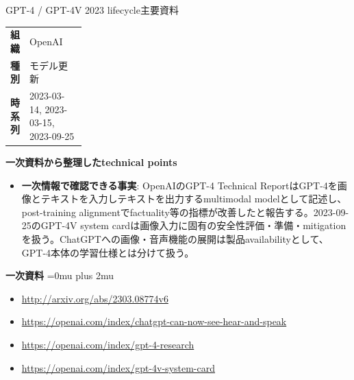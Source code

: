 \begin{technicalnote}{GPT-4 / GPT-4V 2023 lifecycle}{主要資料}
\begingroup
\begin{tabularx}{\linewidth}{@{}>{\bfseries}p{0.22\linewidth}X@{}}
組織 & OpenAI \\
種別 & モデル更新 \\
時系列 & 2023-03-14, 2023-03-15, 2023-09-25 \\
\end{tabularx}
\smallskip
{\bfseries 一次資料から整理したtechnical points}
\begin{itemize}[leftmargin=1.5em,itemsep=0.35em]
\item \textbf{一次情報で確認できる事実}: OpenAIのGPT-4 Technical ReportはGPT-4を画像とテキストを入力しテキストを出力するmultimodal modelとして記述し、post-training alignmentでfactuality等の指標が改善したと報告する。2023-09-25のGPT-4V system cardは画像入力に固有の安全性評価・準備・mitigationを扱う。ChatGPTへの画像・音声機能の展開は製品availabilityとして、GPT-4本体の学習仕様とは分けて扱う。
\end{itemize}
\begin{minipage}{\linewidth}
\begin{samepage}
{\bfseries 一次資料}
\begingroup\sloppy
\Urlmuskip=0mu plus 2mu\relax
\begin{itemize}[leftmargin=1.5em,itemsep=0.25em]
\item {\scriptsize\url{http://arxiv.org/abs/2303.08774v6}}
\item {\scriptsize\url{https://openai.com/index/chatgpt-can-now-see-hear-and-speak}}
\item {\scriptsize\url{https://openai.com/index/gpt-4-research}}
\item {\scriptsize\url{https://openai.com/index/gpt-4v-system-card}}
\end{itemize}
\endgroup
\end{samepage}
\end{minipage}
\endgroup
\end{technicalnote}
\medskip

